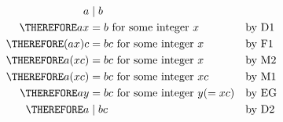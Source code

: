 \begin{align*}
a &\mid b \\
\THEREFORE ax &= b \text{ for some integer $x$}       & & \text{by D1} \\
\THEREFORE (ax)c &= bc \text{ for some integer $x$}   & & \text{by F1} \\
\THEREFORE a(xc) &= bc \text{ for some integer $x$}   & & \text{by M2} \\
\THEREFORE a(xc) &= bc \text{ for some integer $xc$}  & & \text{by M1} \\
\THEREFORE ay &= bc \text{ for some integer $y(=xc)$} & & \text{by EG} \\
\THEREFORE a &\mid bc                                 & & \text{by D2} \\
\end{align*}

